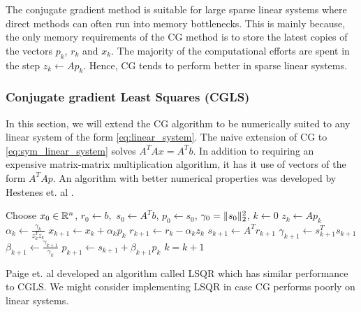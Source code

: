 The conjugate gradient method is suitable for large sparse linear systems where
direct methods can often run into memory bottlenecks. This is mainly because,
the only memory requirements of the CG method is to store the latest copies
of the vectors $p_k$, $r_k$ and $x_k$. The majority of the computational efforts
are spent in the step $z_k \leftarrow A p_k$. Hence, CG tends to perform better
in sparse linear systems.

\subsubsection*{Conjugate gradient Least Squares (CGLS)}
In this section, we will extend the CG algorithm to be numerically suited to any linear system of the form
\eqref{eq:linear_system}. The naive extension of CG to \eqref{eq:sym_linear_system}
solves $A^TAx = A^Tb$. In addition to requiring an expensive matrix-matrix
multiplication algorithm, it has it use of vectors of the form $A^TAp$. An
algorithm with better numerical properties was developed by Hestenes et. al \cite{hestenes1952methods}.


\begin{algorithm}
\begin{algorithmic}[1]
\State Choose $x_0 \in \mathbb{R}^n$, $r_0 \leftarrow b$,\ $s_0 \leftarrow A^Tb$, $p_0 \leftarrow s_0$, $\gamma_0=\| s_0 \|_2^2$, $k \leftarrow 0$
  \State$z_k \leftarrow Ap_k$
  \State$\alpha_k \leftarrow \frac{\gamma_{k}}{z_k^Tz_k}$
  \State$x_{k+1} \leftarrow x_k + \alpha_k p_k$
  \State$r_{k+1} \leftarrow r_k - \alpha_k z_k$
  \State$s_{k+1} \leftarrow A^T r_{k+1} $
  \State$\gamma_{k+1} \leftarrow s_{k+1}^T s_{k+1}$
  \State$\beta_{k+1} \leftarrow \frac{\gamma_{k+1}}{\gamma_k}$
  \State$p_{k+1} \leftarrow s_{k+1} + \beta_{k+1} p_k$
  \State$k = k + 1$
\EndWhile
\end{algorithmic}
\label{alg:cgls}
\end{algorithm}

Paige et. al \cite{paige1982lsqr} developed an algorithm called LSQR which has similar performance
to CGLS. We might consider implementing LSQR in case CG performs poorly on
linear systems.


